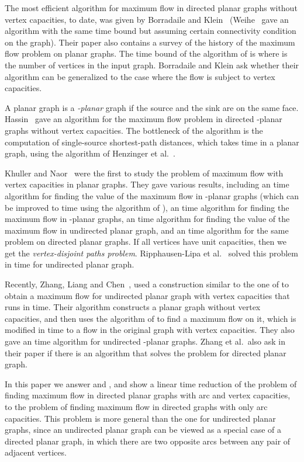 \documentclass[a4paper,11pt]{article}
\begin{document}
The most efficient algorithm for  maximum flow in directed planar
graphs without vertex capacities, to date, was given by Borradaile
and Klein~\cite{BK} (Weihe~\cite{W97} gave an  algorithm with the
same time bound but assuming  certain connectivity condition on the
graph). Their paper also contains a survey of the history of the
maximum flow problem on planar graphs. The time bound of the
algorithm of \cite{BK} is  where  is the number of
vertices in the input graph. Borradaile and Klein ask whether their
algorithm can be generalized to the case where the flow is subject
to vertex capacities.

A planar  graph is a \emph{-planar} graph if the source and the
sink are on the same face. Hassin~\cite{H81} gave an algorithm for
the maximum flow problem in directed -planar graphs without
vertex capacities. The bottleneck of the algorithm is the
computation of single-source shortest-path distances, which takes
 time in a planar graph, using the algorithm of Henzinger et
al.~\cite{HKRS97}.

 Khuller and Naor~\cite{KN94} were the first to study the  problem of maximum flow with vertex
capacities in planar graphs. They gave various results, including an
 time algorithm for finding the value of the
maximum flow in -planar graphs (which can be improved to 
time using the algorithm of \cite{HKRS97}), an  time
algorithm for finding the maximum flow in -planar graphs, an
 time algorithm for finding the value of the maximum
flow in undirected planar graph, and an  time
algorithm for the same problem on directed planar graphs. If all
vertices have unit capacities, then we get the \emph{vertex-disjoint
paths problem}. Ripphausen-Lipa et al.~\cite{RLW97} solved this
problem in  time for undirected planar graph.

Recently, Zhang, Liang and Chen~\cite{ZLC08}, used a construction
similar to the one of \cite{KN94} to obtain a maximum flow for
undirected planar graph with vertex capacities that runs in  time. Their algorithm constructs a planar graph without vertex
capacities, and then uses the algorithm of \cite{BK} to find a
maximum flow on it, which is modified in  time to a
flow in the original graph with vertex capacities.
They also gave an  time algorithm for undirected
-planar graphs. Zhang et al.\ also ask in their paper if there
is an algorithm that solves the problem for directed planar graph.

In this paper we answer \cite{BK} and \cite{ZLC08},  and show a
linear time reduction of the problem of finding maximum flow in
directed planar graphs with arc and vertex capacities, to the
problem of finding maximum flow in directed graphs with only arc
capacities. This problem is more general than the one for undirected
planar graphs, since an undirected planar graph can be viewed as a
special case of a directed planar graph, in which there are two
opposite arcs between any pair of adjacent vertices.
\end{document}
